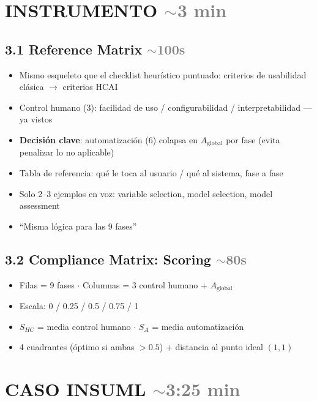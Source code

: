 \documentclass[10pt,a4paper]{article}
\newcommand{\tiempo}[1]{\hfill\normalfont\small\textcolor{gray}{$\sim$#1}}
\newcommand{\clave}[1]{\textbf{#1}}
\begin{document}
\section{INSTRUMENTO \tiempo{3 min}}

\subsection*{3.1 Reference Matrix \tiempo{100s}}
\begin{itemize}
    \item Mismo esqueleto que el checklist heurístico puntuado: criterios de usabilidad clásica $\rightarrow$ criterios HCAI
    \item Control humano (3): facilidad de uso / configurabilidad / interpretabilidad --- ya vistos
    \item \clave{Decisión clave}: automatización (6) colapsa en $A_{\text{global}}$ por fase (evita penalizar lo no aplicable)
    \item Tabla de referencia: qué le toca al usuario / qué al sistema, fase a fase
    \item Solo 2--3 ejemplos en voz: variable selection, model selection, model assessment
    \item ``Misma lógica para las 9 fases''
\end{itemize}

\subsection*{3.2 Compliance Matrix: Scoring \tiempo{80s}}
\begin{itemize}
    \item Filas = 9 fases $\cdot$ Columnas = 3 control humano + $A_{\text{global}}$
    \item Escala: 0 / 0.25 / 0.5 / 0.75 / 1
    \item $S_{HC}$ = media control humano $\cdot$ $S_A$ = media automatización
    \item 4 cuadrantes (óptimo si ambas $>0.5$) + distancia al punto ideal $(1,1)$
\end{itemize}

\section{CASO INSUML \tiempo{3:25 min}}
\end{document}
